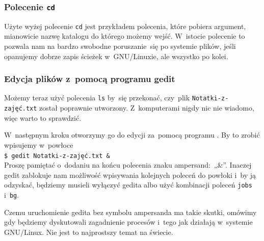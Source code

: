 \documentclass[10pt,t]{beamer}
\begin{document}
\begin{frame}
  \frametitle{Polecenie \texttt{cd}}




  Użyte wyżej polecenie \texttt{cd} jest przykładem polecenia, które
  pobiera argument, mianowicie nazwę katalogu do którego możemy wejść.
  W~istocie polecenie to pozwala nam na bardzo swobodne poruszanie~się
  po systemie plików, jeśli opanujemy dobrze zapis ścieżek w~GNU/Linuxie,
  ale wszystko po kolei.

\end{frame}











\begin{frame}
  \frametitle{Edycja plików z~pomocą programu gedit}


  Możemy teraz użyć polecenia \texttt{ls} by~się przekonać, czy~plik
  \texttt{Notatki-z-zajęć.txt} został poprawnie utworzony.
  Z~komputerami nigdy nic nie wiadomo, więc warto to sprawdzić.

  W~następnym kroku otworzymy go do edycji za~pomocą programu
  . By to zrobić
  wpisujemy w~powłoce \\
  \texttt{\$ gedit Notatki-z-zajęć.txt \&} \\
  Proszę pamiętać o~dodaniu na końcu polecenia znaku
  \alert{ampersand}:~„\&”. Inaczej gedit zablokuje nam możliwość wpisywania
  kolejnych poleceń do powłoki i~by ją odzyskać, będziemy musieli
  wyłączyć gedita albo użyć kombinacji poleceń \texttt{jobs} i~\texttt{bg}.

  Czemu uruchomienie gedita bez symbolu ampersanda ma takie skutki, omówimy
  gdy będziemy dyskutowali zagadnienie procesów i~tego jak działają
  w~systemie GNU/Linux. Nie jest to najprostszy temat na świecie.

\end{frame}
\end{document}
